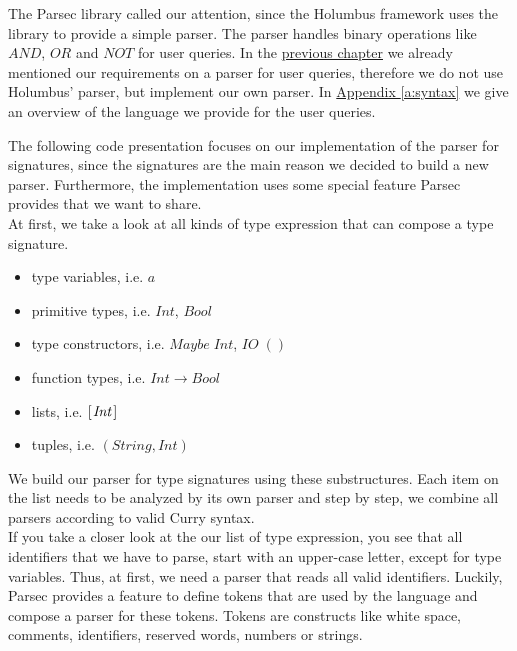 \documentclass[%
	pdftex,%
	a4paper,%
	oneside,%
	chapterprefix,%
	headsepline,%
	12pt%
]{scrbook}
\newcommand{\Conid}[1]{\mathit{#1}}
\newcommand{\Varid}[1]{\mathit{#1}}
\begin{document}
The Parsec library called our attention, since the Holumbus framework
uses the library to provide a simple parser. %
The parser handles binary operations like \ensuremath{\Conid{AND}}, \ensuremath{\Conid{OR}} and \ensuremath{\Conid{NOT}} for
user queries. %
In the \hyperref[analysis:parser]{previous chapter} we already
mentioned our requirements on a parser for user queries, therefore we
do not use Holumbus' parser, but implement our own parser. %
In \hyperref[a:syntax]{Appendix \ref{a:syntax}} we give an overview of
the language we provide for the user queries. %

The following code presentation focuses on our implementation of the
parser for signatures, since the signatures are the main reason we
decided to build a new parser. %
Furthermore, the implementation uses some special feature Parsec
provides that we want to share. \\ %

At first, we take a look at all kinds of type expression that can
compose a type signature. %

\begin{itemize}
\item type variables, i.e. \ensuremath{\Varid{a}}
\item primitive types, i.e. \ensuremath{\Conid{Int}}, \ensuremath{\Conid{Bool}}
\item type constructors, i.e. \ensuremath{\Conid{Maybe}\;\Conid{Int}}, \ensuremath{\Conid{IO}\;()}
\item function types, i.e. \ensuremath{\Conid{Int}\to \Conid{Bool}}
\item lists, i.e. \ensuremath{[\mskip1.5mu \Conid{Int}\mskip1.5mu]}
\item tuples, i.e. \ensuremath{(\Conid{String},\Conid{Int})}
\end{itemize}

We build our parser for type signatures using these substructures. %
Each item on the list needs to be analyzed by its own parser and step
by step, we combine all parsers according to valid Curry syntax. \\

If you take a closer look at the our list of type expression, you see
that all identifiers that we have to parse, start with an upper-case
letter, except for type variables. %
Thus, at first, we need a parser that reads all valid identifiers. %
Luckily, Parsec provides a feature to define tokens that are used
by the language and compose a parser for these tokens. %
Tokens are constructs like white space, comments, identifiers,
reserved words, numbers or strings. %
\end{document}
